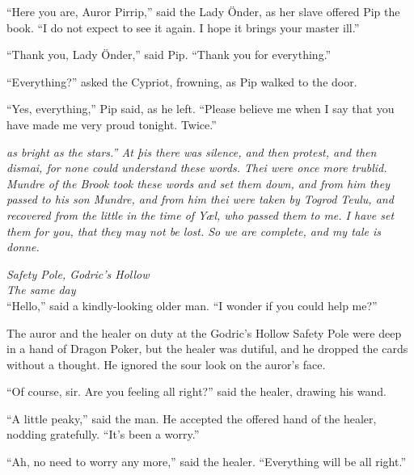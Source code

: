 ``Here you are, Auror Pirrip,'' said the Lady Önder, as her slave
offered Pip the book. ``I do not expect to see it again. I hope it
brings your master ill.''

``Thank you, Lady Önder,'' said Pip. ``Thank you for everything.''

``Everything?'' asked the Cypriot, frowning, as Pip walked to the door.

``Yes, everything,'' Pip said, as he left. ``Please believe me when I
say that you have made me very proud tonight. Twice.''

\mybreak

\emph{as bright as the stars.'' At þis there was silence, and then
protest, and then dismai, for none could understand these words. Thei
were once more trublid. Mundre of the Brook took these words and set
them down, and from him they passed to his son Mundre, and from him thei
were taken by Togrod Teulu, and recovered from the little in the time of
Yæl, who passed them to me. I have set them for you, that they may not
be lost. So we are complete, and my tale is donne.}

\mybreak

\emph{Safety Pole, Godric's Hollow}\\
\emph{The same day}\\

``Hello,'' said a kindly-looking older man. ``I wonder if you could help
me?''

The auror and the healer on duty at the Godric's Hollow Safety Pole were
deep in a hand of Dragon Poker, but the healer was dutiful, and he
dropped the cards without a thought. He ignored the sour look on the
auror's face.

``Of course, sir. Are you feeling all right?'' said the healer, drawing
his wand.

``A little peaky,'' said the man. He accepted the offered hand of the
healer, nodding gratefully. ``It's been a worry.''

``Ah, no need to worry any more,'' said the healer. ``Everything will be
all right.''

\mybreak

